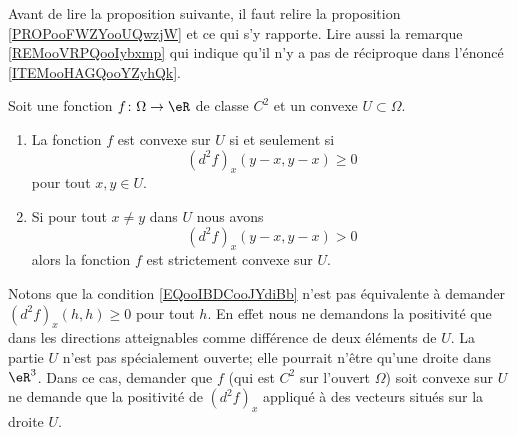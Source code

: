 Avant de lire la proposition suivante, il faut relire la proposition \ref{PROPooFWZYooUQwzjW} et ce qui s'y rapporte. 
Lire aussi la remarque \ref{REMooVRPQooIybxmp} qui indique
qu'il n'y a pas de réciproque dans l'énoncé \ref{ITEMooHAGQooYZyhQk}.     
\begin{proposition}
    Soit une fonction \( f\colon \Omega\to \eR\) de classe \( C^2\) et un convexe \( U\subset \Omega\).
    \begin{enumerate}
        \item       \label{ITEMooZQCAooIFjHOn}
            La fonction \( f\) est convexe sur \( U\) si et seulement si
            \begin{equation}        \label{EQooIBDCooJYdiBb}
                (d^2f)_x(y-x,y-x)\geq 0
            \end{equation}
            pour tout \( x,y\in U\).
        \item       \label{ITEMooHAGQooYZyhQk}
            Si pour tout \( x\neq y\) dans \( U\) nous avons
            \begin{equation}
                (d^2f)_x(y-x,y-x)>0
            \end{equation}
            alors la fonction \( f\) est strictement convexe sur \( U\).
    \end{enumerate}
\end{proposition}

\begin{remark}      \label{REMooYCRKooEQNIkC}
    Notons que la condition \eqref{EQooIBDCooJYdiBb} n'est pas équivalente à demander \( (d^2f)_x(h,h)\geq 0\) pour tout \( h\). En effet nous ne demandons la positivité que dans les directions atteignables comme différence de deux éléments de \( U\). La partie \( U\) n'est pas spécialement ouverte; elle pourrait n'être qu'une droite dans \( \eR^3\). Dans ce cas, demander que \( f\) (qui est \( C^2\) sur l'ouvert \( \Omega\)) soit convexe sur \( U\) ne demande que la positivité de \( (d^2f)_x\) appliqué à des vecteurs situés sur la droite \( U\).
\end{remark}

